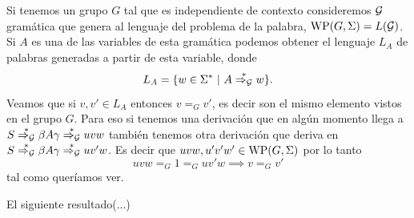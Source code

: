 \documentclass[tesis.tex]{subfiles}
\begin{document}
\begin{obs}\label{palabras-wp}
	Si tenemos un grupo $G$ tal que es independiente de contexto consideremos $\cal G$ gramática que genera al lenguaje del problema de la palabra, $\text{WP}(G, \Sigma) = L(\cal G)$.
	Si $A$ es una de las variables de esta gramática podemos obtener el lenguaje $L_A$ de palabras generadas a partir de esta variable, donde
	\[
	L_A = \{ w \in \Sigma^*  \ | \ A \overset{*}{\Rightarrow_{\cal G}} w  \}.
	\]
	Veamos que si $v,v' \in L_A$ entonces $v =_G v'$, es decir son el mismo elemento vistos en el grupo $G$. 
	Para eso si tenemos una derivación que en algún momento llega a $S \overset{*}{\Rightarrow_{\cal G}} \beta A \gamma \overset{*}{\Rightarrow_{\cal G}} uvw$ también tenemos otra derivación que deriva en $S \overset{*}{\Rightarrow_{\cal G}} \beta A \gamma  \overset{*}{\Rightarrow_{\cal G}} uv'w$. 
	Es decir que $uvw, u'v'w' \in \text{WP}(G, \Sigma)$ por lo tanto 
	\begin{equation*}
		uvw =_G 1 =_G uv'w \implies v =_G v'
	\end{equation*}
	tal como queríamos ver.
\end{obs}



El siguiente resultado(...)
\end{document}
